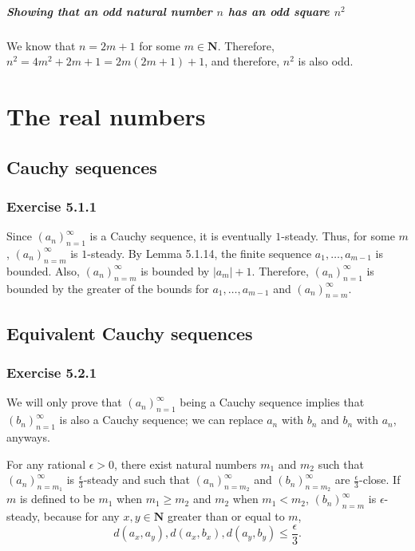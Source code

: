 \documentclass[12pt, oneside]{book}
\begin{document}
	\paragraph*{Showing that an odd natural number $n$ has an odd square $n^2$}
	
	We know that $n = 2m + 1$ for some $m \in \mathbf{N}$. Therefore, $n^2 = 4m^2 + 2m + 1 = 2m(2m + 1) + 1$, and therefore, $n^2$ is also odd.
	
	\chapter{The real numbers}
	
	\section{Cauchy sequences}
	
	\subsection*{Exercise 5.1.1}
	
	Since $(a_n)_{n = 1}^\infty$ is a Cauchy sequence, it is eventually $1$-steady. Thus, for some $m$, $(a_n)_{n = m}^\infty$ is $1$-steady. By Lemma 5.1.14, the finite sequence $a_1, \dotsc, a_{m - 1}$ is bounded. Also, $(a_n)_{n = m}^\infty$ is bounded by $|a_m| + 1$. Therefore, $(a_n)_{n = 1}^\infty$ is bounded by the greater of the bounds for $a_1, \dotsc, a_{m - 1}$ and $(a_n)_{n = m}^\infty$.
	
	\section{Equivalent Cauchy sequences}
	
	\subsection*{Exercise 5.2.1}
	
	We will only prove that $(a_n)_{n = 1}^\infty$ being a Cauchy sequence implies that $(b_n)_{n = 1}^\infty$ is also a Cauchy sequence; we can replace $a_n$ with $b_n$ and $b_n$ with $a_n$, anyways.
	
	For any rational $\epsilon > 0$, there exist natural numbers $m_1$ and $m_2$ such that $(a_n)_{n = m_1}^\infty$ is $\frac{\epsilon}{3}$-steady and such that $(a_n)_{n = m_2}^\infty$ and $(b_n)_{n = m_2}^\infty$ are $\frac{\epsilon}{3}$-close. If $m$ is defined to be $m_1$ when $m_1 \ge m_2$ and $m_2$ when $m_1 < m_2$, $(b_n)_{n = m}^\infty$ is $\epsilon$-steady, because for any $x, y \in \mathbf{N}$ greater than or equal to $m$,
	\[d(a_x, a_y), d(a_x, b_x), d(a_y, b_y) \le \frac{\epsilon}{3}.\]
	
\end{document}
